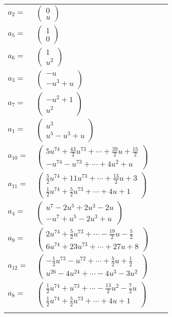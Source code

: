 \documentclass[1p]{elsarticle_modified}
\theoremstyle{definition}
\begin{document}
\begin{tabular}{m{7pt} m{180pt} m{7pt} m{180pt} }
\flushright $a_{2}=$&$\begin{pmatrix}0\\u\end{pmatrix}$ \\
\flushright $a_{5}=$&$\begin{pmatrix}1\\0\end{pmatrix}$ \\
\flushright $a_{6}=$&$\begin{pmatrix}1\\u^2\end{pmatrix}$ \\
\flushright $a_{3}=$&$\begin{pmatrix}- u\\- u^3+u\end{pmatrix}$ \\
\flushright $a_{7}=$&$\begin{pmatrix}- u^2+1\\u^2\end{pmatrix}$ \\
\flushright $a_{1}=$&$\begin{pmatrix}u^3\\u^5- u^3+u\end{pmatrix}$ \\
\flushright $a_{10}=$&$\begin{pmatrix}5 u^{74}+\frac{43}{2} u^{73}+\cdots+\frac{39}{2} u+\frac{15}{2}\\- u^{74}- u^{73}+\cdots+4 u^2+u\end{pmatrix}$ \\
\flushright $a_{11}=$&$\begin{pmatrix}\frac{5}{2} u^{74}+11 u^{73}+\cdots+\frac{13}{2} u+3\\\frac{1}{2} u^{74}+\frac{5}{2} u^{73}+\cdots+4 u+1\end{pmatrix}$ \\
\flushright $a_{4}=$&$\begin{pmatrix}u^7-2 u^5+2 u^3-2 u\\- u^7+u^5-2 u^3+u\end{pmatrix}$ \\
\flushright $a_{9}=$&$\begin{pmatrix}2 u^{74}+\frac{5}{2} u^{73}+\cdots-\frac{19}{2} u-\frac{5}{2}\\6 u^{74}+23 u^{73}+\cdots+27 u+8\end{pmatrix}$ \\
\flushright $a_{12}=$&$\begin{pmatrix}-\frac{1}{2} u^{73}- u^{72}+\cdots+\frac{5}{2} u+\frac{1}{2}\\u^{26}-4 u^{24}+\cdots-4 u^3-3 u^2\end{pmatrix}$ \\
\flushright $a_{8}=$&$\begin{pmatrix}\frac{1}{2} u^{74}+u^{73}+\cdots-\frac{13}{2} u^2-\frac{7}{2} u\\\frac{1}{2} u^{74}+\frac{5}{2} u^{73}+\cdots+4 u+1\end{pmatrix}$\\&\end{tabular}
\end{document}
